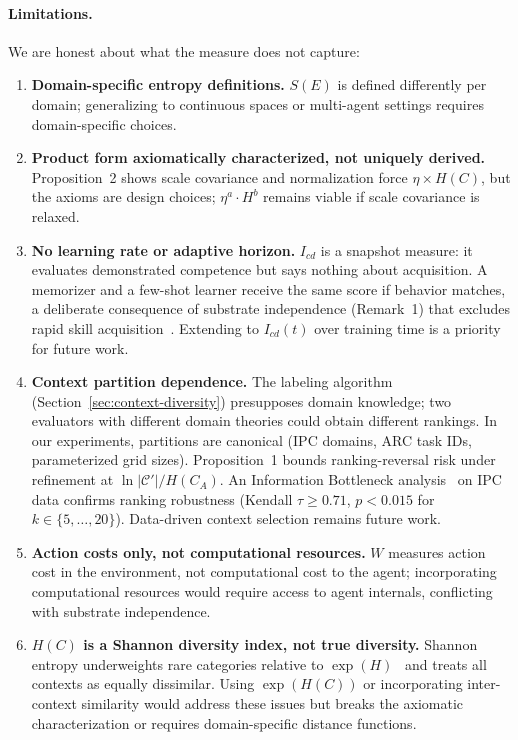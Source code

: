 \documentclass[runningheads,a4paper]{llncs}
\begin{document}
\paragraph{Limitations.} We are honest about what the measure does not capture:
\begin{enumerate}
\item \textbf{Domain-specific entropy definitions.} $S(E)$ is defined differently per domain; generalizing to continuous spaces or multi-agent settings requires domain-specific choices.
\item \textbf{Product form axiomatically characterized, not uniquely derived.} Proposition~2 shows scale covariance and normalization force $\eta \times H(C)$, but the axioms are design choices; $\eta^a \cdot H^b$ remains viable if scale covariance is relaxed.
\item \textbf{No learning rate or adaptive horizon.} $I_{cd}$ is a snapshot measure: it evaluates demonstrated competence but says nothing about acquisition. A memorizer and a few-shot learner receive the same score if behavior matches, a deliberate consequence of substrate independence (Remark~1) that excludes rapid skill acquisition~\cite{chollet2019measure}. Extending to $I_{cd}(t)$ over training time is a priority for future work.
\item \textbf{Context partition dependence.} The labeling algorithm (Section~\ref{sec:context-diversity}) presupposes domain knowledge; two evaluators with different domain theories could obtain different rankings. In our experiments, partitions are canonical (IPC domains, ARC task IDs, parameterized grid sizes). Proposition~1 bounds ranking-reversal risk under refinement at $\ln|\mathcal{C}'|/H(C_A)$. An Information Bottleneck analysis~\cite{tishby1999information} on IPC data confirms ranking robustness (Kendall $\tau \geq 0.71$, $p < 0.015$ for $k \in \{5,\ldots,20\}$). Data-driven context selection remains future work.
\item \textbf{Action costs only, not computational resources.} $W$ measures action cost in the environment, not computational cost to the agent; incorporating computational resources would require access to agent internals, conflicting with substrate independence.
\item \textbf{$H(C)$ is a Shannon diversity index, not true diversity.} Shannon entropy underweights rare categories relative to $\exp(H)$~\cite{magurran2004measuring} and treats all contexts as equally dissimilar. Using $\exp(H(C))$ or incorporating inter-context similarity would address these issues but breaks the axiomatic characterization or requires domain-specific distance functions.

\end{enumerate}
\end{document}
